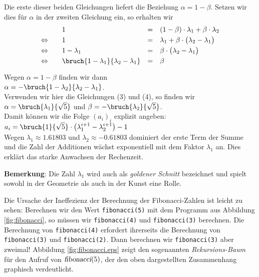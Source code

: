 Die erste dieser beiden Gleichungen liefert die Beziehung $\alpha = 1 - \beta$.  Setzen
wir dies f\"ur $\alpha$ in der zweiten Gleichung ein, so erhalten wir 
\[
\begin{array}{clcl}
                      &  1 & = & (1 - \beta)\cdot  \lambda_1 + \beta \cdot \lambda_2 \\[0.1cm]
\Leftrightarrow\quad  &  1 & = & 
 \lambda_1  + \beta \cdot \bigl( \lambda_2 - \lambda_1\bigr) \\[0.1cm]
\Leftrightarrow\quad  &  1 - \lambda_1 & = & \beta \cdot \bigl(\lambda_2 - \lambda_1\bigr)  \\[0.1cm]
\Leftrightarrow\quad  &  \bruch{1 - \lambda_1}{\lambda_2 - \lambda_1} & = & \beta \\[0.1cm]
\end{array}
\]
Wegen $\alpha = 1 - \beta$ finden wir dann \\[0.1cm]
\hspace*{1.3cm} $\alpha = - \bruch{1 - \lambda_2}{\lambda_2 - \lambda_1}$. \\[0.1cm]
Verwenden  wir hier die Gleichungen (3) und (4), so finden wir \\[0.1cm]
\hspace*{1.3cm} 
$\alpha = \bruch{\lambda_1}{\sqrt{5}} $ \quad und \quad $\beta  = -\bruch{\lambda_2}{\sqrt{5}}$. \\[0.1cm]
Damit k\"onnen wir die Folge $(a_i)_i$ explizit angeben: \\[0.1cm]
\hspace*{1.3cm} 
$\displaystyle 
   a_i = \bruch{1}{\sqrt{5}} \cdot \left( \lambda_1^{i+1} - \lambda_2^{i+1} \right) - 1$ \\[0.1cm]
Wegen $\lambda_1\approx 1.61803$ und $\lambda_2 \approx - 0.61803$ dominiert der erste Term
der Summe und die Zahl der Additionen w\"achst exponentiell mit dem Faktor $\lambda_1$ an.
Dies erkl\"art das starke Anwachsen der Rechenzeit.
\vspace*{0.3cm}

\noindent
\textbf{Bemerkung}:  Die Zahl $\lambda_1$ wird auch als \emph{goldener Schnitt} bezeichnet
und spielt sowohl in der Geometrie als auch in der Kunst eine Rolle.

\noindent
Die Ursache der Ineffezienz der Berechnung der Fibonacci-Zahlen ist leicht zu sehen: Berechnen wir 
den Wert \texttt{fibonacci(5)} mit dem Programm aus Abbildung
\ref{fig:fibonacci}, so m\"ussen wir \texttt{fibonacci(4)} und \texttt{fibonacci(3)} berechnen.
Die Berechnung von \texttt{fibonacci(4)} erfordert ihrerseits die Berechnung von \texttt{fibonacci(3)} und \texttt{fibonacci(2)}. 
Dann berechnen wir \texttt{fibonacci(3)} aber zweimal!  
Abbildung \ref{fig:fibonacci.eps} zeigt den sogenannten \emph{Rekursions-Baum} f\"ur den
Aufruf von $\textsl{fibonacci}(5)$, der den oben dargestellten Zusammenhang graphisch verdeutlicht.

